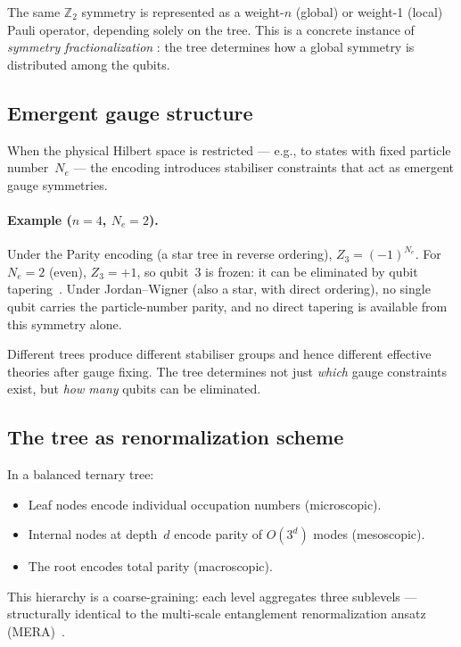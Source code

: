 The same $\mathbb{Z}_2$ symmetry is represented as a weight-$n$ (global)
or weight-1 (local) Pauli operator, depending solely on the tree.  This
is a concrete instance of \emph{symmetry fractionalization}
\cite{wen2017zoo}: the tree determines how a global symmetry is
distributed among the qubits.


\subsection{Emergent gauge structure}
\label{sec:em-gauge}

When the physical Hilbert space is restricted — e.g., to states with
fixed particle number~$N_e$ — the encoding introduces stabiliser
constraints that act as emergent gauge symmetries.

\paragraph{Example ($n=4$, $N_e=2$).}
Under the Parity encoding (a star tree in reverse ordering),
$Z_3 = (-1)^{N_e}$.  For $N_e = 2$ (even),
$Z_3 = +1$, so qubit~3 is frozen: it can be eliminated by qubit
tapering~\cite{bravyi2017tapering}.  Under Jordan--Wigner (also a star,
with direct ordering), no single
qubit carries the particle-number parity, and no direct tapering is
available from this symmetry alone.

Different trees produce different stabiliser groups and hence different
effective theories after gauge fixing.  The tree determines not just
\emph{which} gauge constraints exist, but \emph{how many} qubits can
be eliminated.


\subsection{The tree as renormalization scheme}
\label{sec:em-renorm}

In a balanced ternary tree:
\begin{itemize}
  \item Leaf nodes encode individual occupation numbers (microscopic).
  \item Internal nodes at depth~$d$ encode parity of $O(3^d)$ modes
        (mesoscopic).
  \item The root encodes total parity (macroscopic).
\end{itemize}
This hierarchy is a coarse-graining: each level aggregates three
sublevels — structurally identical to the multi-scale entanglement
renormalization ansatz (MERA)~\cite{vidal2007mera,swingle2012}.

